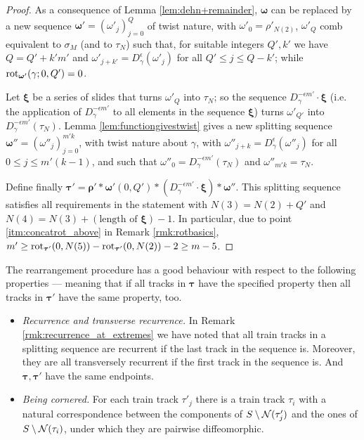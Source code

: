 \begin{proof}
As a consequence of Lemma \ref{lem:dehn+remainder}, $\bm\omega$ can be replaced by a new sequence $\bm\omega'=(\omega'_j)_{j=0}^{Q}$ of twist nature, with $\omega'_0=\rho'_{N(2)}$, $\omega'_Q$ comb equivalent to $\sigma_M$ (and to $\tau_N$) such that, for suitable integers $Q', k'$ we have $Q=Q'+k'm'$ and $\omega'_{j+k'}= D_\gamma^\epsilon(\omega'_j)$ for all $Q'\leq j\leq Q-k'$; while $\mathrm{rot}_{\bm\omega'}(\gamma;0,Q')=0$.

Let $\bm\xi$ be a series of slides that turns $\omega'_Q$ into $\tau_N$; so the sequence $D_\gamma^{-\epsilon m'}\cdot\bm\xi$ (i.e. the application of $D_\gamma^{-\epsilon m'}$ to all elements in the sequence $\bm\xi$) turns $\omega'_{Q'}$ into $D_\gamma^{-\epsilon m'}(\tau_N)$. Lemma \ref{lem:functiongivestwist} gives a new splitting sequence $\bm\omega''=(\omega''_j)_{j=0}^{m'k}$, with twist nature about $\gamma$, with $\omega''_{j+k}= D_\gamma^\epsilon(\omega''_j)$ for all $0\leq j\leq m'(k-1)$, and such that $\omega''_0=D_\gamma^{-\epsilon m'}(\tau_N)$ and $\omega''_{m'k}=\tau_N$.

Define finally $\bm\tau'=\bm\rho'*\bm\omega'(0,Q')*(D_\gamma^{-\epsilon m'}\cdot\bm\xi)*\bm\omega''$. This splitting sequence satisfies all requirements in the statement with $N(3)=N(2)+Q'$ and $N(4)=N(3)+ (\text{length of }\bm\xi)-1$. In particular, due to point \ref{itm:concatrot_above} in Remark \ref{rmk:rotbasics}, $m'\geq \mathrm{rot}_{\bm\tau'}(0,N(5))-\mathrm{rot}_{\bm\tau'}(0,N(2))-2 \geq m-5$.
\end{proof}

\begin{rmk}
The rearrangement procedure has a good behaviour with respect to the following properties --- meaning that if all tracks in $\bm\tau$ have the specified property then all tracks in $\bm\tau'$ have the same property, too.
\begin{itemize}
\item \textit{Recurrence and transverse recurrence.} In Remark \ref{rmk:recurrence_at_extremes} we have noted that all train tracks in a splitting sequence are recurrent if the last track in the sequence is. Moreover, they are all transversely recurrent if the first track in the sequence is. And $\bm\tau,\bm\tau'$ have the same endpoints.
\item \textit{Being cornered.} For each train track $\tau'_j$ there is a train track $\tau_i$ with a natural correspondence between the components of $S\setminus{\mathcal N}(\tau'_j)$ and the ones of $S\setminus{\mathcal N}(\tau_i)$, under which they are pairwise diffeomorphic.
\end{itemize}
\end{rmk}

